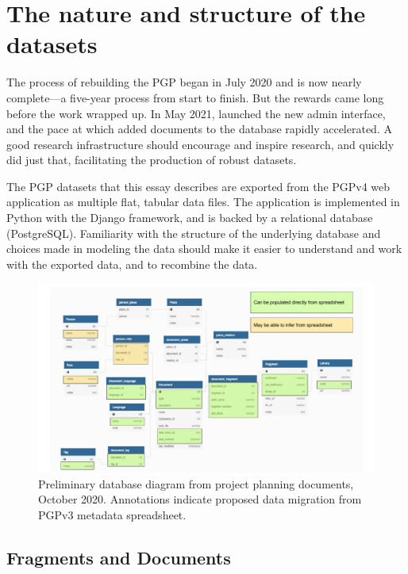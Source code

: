 \documentclass{article}
\begin{document}
\section{The nature and structure of the datasets}

The process of rebuilding the PGP began in July 2020 and is now nearly complete—a five-year process from start to finish. But the rewards came long before the work wrapped up. In May 2021,  launched the new admin interface, and the pace at which  added documents to the database rapidly accelerated. A good research infrastructure should encourage and inspire research, and  quickly did just that, facilitating the production of robust datasets. 

The PGP datasets that this essay describes are exported from the PGPv4 web application as multiple flat, tabular data files. The application is implemented in Python with the Django framework, and is backed by a relational database (PostgreSQL). Familiarity with the structure of the underlying database and choices made in modeling the data should make it easier to understand and work with the exported data, and to recombine the data. 

\begin{figure}[!ht]
  \includegraphics[width=\textwidth]{db-diagrams/pgpv4_dbdiagram_import.pdf}
  \centering
  \caption{Preliminary database diagram from project planning documents, October 2020. Annotations indicate proposed data migration from PGPv3 metadata spreadsheet.}
  \label{fig:pgpv4_dbdiagram}
\end{figure}


\subsection{Fragments and Documents}
\end{document}
